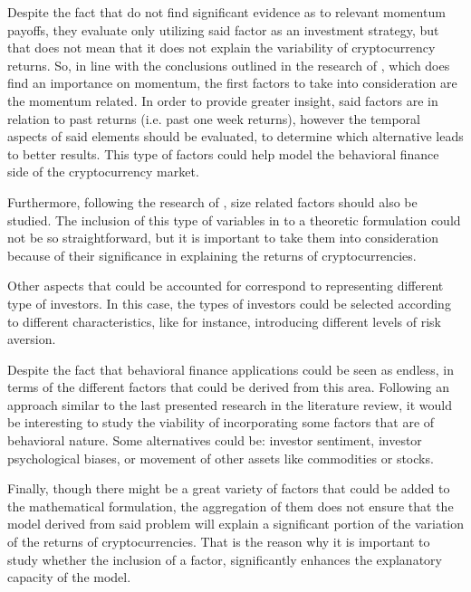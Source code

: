 Despite the fact that \parencite{GROBYS20196} do not find significant evidence as to relevant momentum payoffs, they evaluate only utilizing said factor as an investment strategy, but that does not mean that it does not explain the variability of cryptocurrency returns. So, in line with the conclusions outlined in the research of \parencite{liu2022common}, which does find an importance on momentum, the first factors to take into consideration are the momentum related. In order to provide greater insight, said factors are in relation to past returns (i.e. past one week returns), however the temporal aspects of said elements should be evaluated, to determine which alternative leads to better results. This type of factors could help model the behavioral finance side of the cryptocurrency market.

Furthermore, following the research of \parencite{liu2022common}, size related factors should also be studied. The inclusion of this type of variables in to a theoretic formulation could not be so straightforward, but it is important to take them into consideration because of their significance in explaining the returns of cryptocurrencies. 

Other aspects that could be accounted for correspond to representing different type of investors. In this case, the types of investors could be selected according to different characteristics, like for instance, introducing different levels of risk aversion.

Despite the fact that behavioral finance applications could be seen as endless, in terms of the different factors that could be derived from this area. Following an approach similar to the last presented research \parencite{Bennett2023} in the literature review, it would be interesting to study the viability of incorporating some factors that are of behavioral nature. Some alternatives could be: investor sentiment, investor psychological biases, or movement of other assets like commodities or stocks.

Finally, though there might be a great variety of factors that could be added to the mathematical formulation, the aggregation of them does not ensure that the model derived from said problem will explain a significant portion of the variation of the returns of cryptocurrencies. That is the reason why it is important to study whether the inclusion of a factor, significantly enhances the explanatory capacity of the model.
